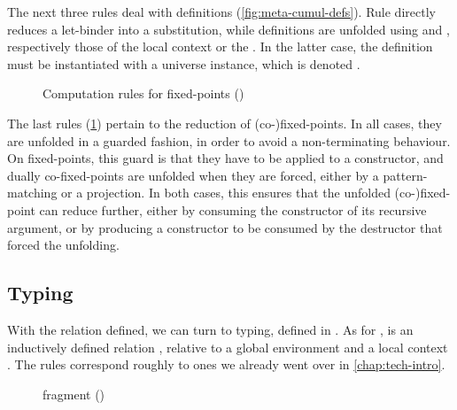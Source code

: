 \begin{figure*}
  \ContinuedFloat
  \caption{Computation rules for definitions ()}
  \label{fig:meta-cumul-defs}
\end{figure*}

The next three rules deal with definitions (\cref{fig:meta-cumul-defs}).
Rule  directly reduces a
let-binder into a substitution, while definitions are unfolded using  and ,
respectively those of the local context or the . In the latter
case, the definition must be instantiated with a universe instance, which is denoted .

\begin{figure}[h]
  \ContinuedFloat
  \caption{Computation rules for fixed-points ()}
  \label{fig:meta-cumul-fix}
\end{figure}

The last rules (\cref{fig:meta-cumul-fix}) pertain to the reduction of (co-)fixed-points.
In all cases, they are unfolded in a guarded fashion, in order to avoid a non-terminating behaviour.
On fixed-points, this guard is that they have to be applied to a constructor,
and dually co-fixed-points are unfolded when
they are forced, either by a pattern-matching or a projection. In both cases, this ensures that
the unfolded (co-)fixed-point can reduce further, either by consuming the constructor of
its recursive argument, or by producing a constructor to be consumed by the destructor
that forced the unfolding.

\FloatBarrier
\subsection{Typing}

With the  relation defined, we can turn to typing, defined in .
As for , 
is an inductively defined relation ,
relative to a global environment  and a local context .
The rules correspond roughly to ones we already went over in \cref{chap:tech-intro}.

\begin{figure}
  \ContinuedFloat*
  \caption{ fragment ()}
  \label{fig:meta-typing-ccw}
\end{figure}

